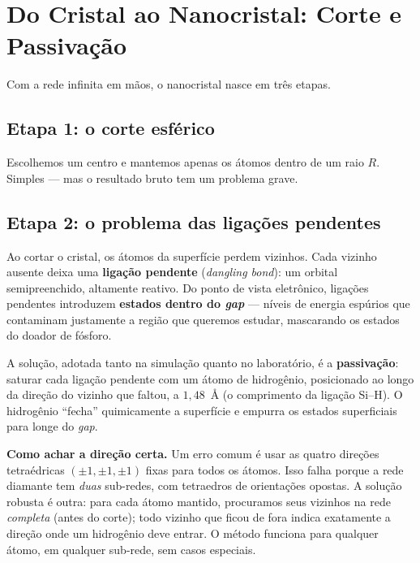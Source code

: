 \documentclass[11pt,a4paper,openany]{book}
\begin{document}
\section{Do Cristal ao Nanocristal: Corte e Passivação}
\label{sec:corte}

Com a rede infinita em mãos, o nanocristal nasce em três etapas.

\subsection{Etapa 1: o corte esférico}

Escolhemos um centro e mantemos apenas os átomos dentro de um raio $R$. Simples ---
mas o resultado bruto tem um problema grave.

\subsection{Etapa 2: o problema das ligações pendentes}

Ao cortar o cristal, os átomos da superfície perdem vizinhos. Cada vizinho
ausente deixa uma \textbf{ligação pendente} (\emph{dangling bond}): um orbital
semipreenchido, altamente reativo. Do ponto de vista eletrônico, ligações
pendentes introduzem \textbf{estados dentro do \emph{gap}} --- níveis de energia
espúrios que contaminam justamente a região que queremos estudar, mascarando os
estados do doador de fósforo.

A solução, adotada tanto na simulação quanto no laboratório, é a
\textbf{passivação}: saturar cada ligação pendente com um átomo de hidrogênio,
posicionado ao longo da direção do vizinho que faltou, a $1{,}48$~Å (o
comprimento da ligação Si--H). O hidrogênio ``fecha'' quimicamente a superfície e
empurra os estados superficiais para longe do \emph{gap}.

\begin{caixanota}
\textbf{Como achar a direção certa.} Um erro comum é usar as quatro direções
tetraédricas $(\pm1,\pm1,\pm1)$ fixas para todos os átomos. Isso falha porque a
rede diamante tem \emph{duas} sub-redes, com tetraedros de orientações opostas.
A solução robusta é outra: para cada átomo mantido, procuramos seus vizinhos na
rede \emph{completa} (antes do corte); todo vizinho que ficou de fora indica
exatamente a direção onde um hidrogênio deve entrar. O método funciona para
qualquer átomo, em qualquer sub-rede, sem casos especiais.
\end{caixanota}
\end{document}
